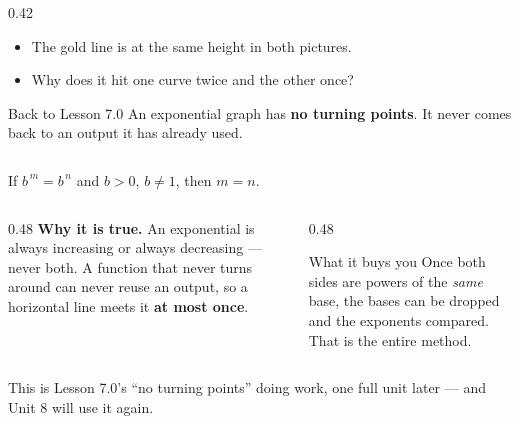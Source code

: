 \documentclass[aspectratio=169, 11pt]{beamer}
\begin{document}
\begin{frame}[t, plain]
\begin{columns}[T]
\begin{column}{0.42\textwidth}
\begin{itemize}
        \item The gold line is at the same height in both pictures.
        \item Why does it hit one curve twice and the other once?
      \end{itemize}
      \vspace{3pt}
      \begin{block}{Back to Lesson 7.0}
        An exponential graph has \textbf{no turning points}. It never comes back to an output it has
        already used.
      \end{block}
    \end{column}
  \end{columns}
\end{frame}

\begin{frame}[t, plain]
  \begin{center}
    \Large If \; $b^{\,m}=b^{\,n}$ \; and \; $b>0$, $b\neq1$, \qquad then \; $m=n$.
  \end{center}
  \vspace{10pt}
  \begin{columns}[T]
    \begin{column}{0.48\textwidth}
      \footnotesize
      \textbf{Why it is true.} An exponential is always increasing or always decreasing --- never both.
      A function that never turns around can never reuse an output, so a horizontal line meets it
      \textbf{at most once}.
    \end{column}
    \begin{column}{0.48\textwidth}
      \begin{block}{What it buys you}
        Once both sides are powers of the \emph{same} base, the bases can be dropped and the exponents
        compared. That is the entire method.
      \end{block}
    \end{column}
  \end{columns}
  \vspace{8pt}
  \begin{center}
    {\footnotesize This is Lesson 7.0's ``no turning points'' doing work, one full unit later --- and
    Unit 8 will use it again.}
  \end{center}
\end{frame}
\end{document}
